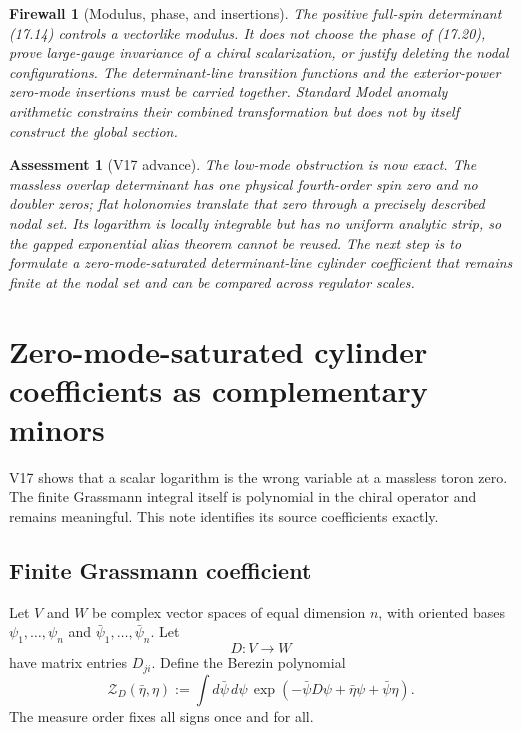 \documentclass[11pt]{article}
\newtheorem{assessment}[theorem]{Assessment}
\newtheorem{firewall}[theorem]{Firewall}
\begin{document}
\begin{firewall}[Modulus, phase, and insertions]
\label{fw:v11v17-section}
The positive full-spin determinant (17.14) controls a vectorlike modulus.
It does not choose the phase of (17.20), prove large-gauge invariance of a
chiral scalarization, or justify deleting the nodal configurations.
The determinant-line transition functions and the exterior-power
zero-mode insertions must be carried together.  Standard Model anomaly
arithmetic constrains their combined transformation but does not by
itself construct the global section.
\end{firewall}

\begin{assessment}[V17 advance]
\label{ass:v11v17}
The low-mode obstruction is now exact.  The massless overlap determinant
has one physical fourth-order spin zero and no doubler zeros; flat
holonomies translate that zero through a precisely described nodal set.
Its logarithm is locally integrable but has no uniform analytic strip, so
the gapped exponential alias theorem cannot be reused.  The next step is
to formulate a zero-mode-saturated determinant-line cylinder coefficient
that remains finite at the nodal set and can be compared across regulator
scales.
\end{assessment}


\section{Zero-mode-saturated cylinder coefficients as complementary minors}
\label{sec:v11v18}

V17 shows that a scalar logarithm is the wrong variable at a massless
toron zero.  The finite Grassmann integral itself is polynomial in the
chiral operator and remains meaningful.  This note identifies its
source coefficients exactly.

\subsection{Finite Grassmann coefficient}

Let \(V\) and \(W\) be complex vector spaces of equal dimension \(n\),
with oriented bases \(\psi_1,\ldots,\psi_n\) and
\(\bar\psi_1,\ldots,\bar\psi_n\).  Let
\[
 D:V\longrightarrow W
 \tag{18.1}
\]
have matrix entries \(D_{ji}\).  Define the Berezin polynomial
\[
 \mathcal Z_D(\bar\eta,\eta)
 :=
 \int d\bar\psi\,d\psi\,
 \exp\left(
 -\bar\psi D\psi+\bar\eta\psi+\bar\psi\eta
 \right).
 \tag{18.2}
\]
The measure order fixes all signs once and for all.
\end{document}
